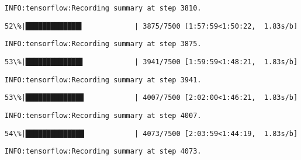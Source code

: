 \documentclass[11pt]{article}
\begin{document}
    \begin{Verbatim}[commandchars=\\\{\}]
INFO:tensorflow:Recording summary at step 3810.

    \end{Verbatim}

    \begin{Verbatim}[commandchars=\\\{\}]
 52\%|█████████████▍            | 3875/7500 [1:57:59<1:50:22,  1.83s/b]
    \end{Verbatim}

    \begin{Verbatim}[commandchars=\\\{\}]
INFO:tensorflow:Recording summary at step 3875.

    \end{Verbatim}

    \begin{Verbatim}[commandchars=\\\{\}]
 53\%|█████████████▋            | 3941/7500 [1:59:59<1:48:21,  1.83s/b]
    \end{Verbatim}

    \begin{Verbatim}[commandchars=\\\{\}]
INFO:tensorflow:Recording summary at step 3941.

    \end{Verbatim}

    \begin{Verbatim}[commandchars=\\\{\}]
 53\%|█████████████▉            | 4007/7500 [2:02:00<1:46:21,  1.83s/b]
    \end{Verbatim}

    \begin{Verbatim}[commandchars=\\\{\}]
INFO:tensorflow:Recording summary at step 4007.

    \end{Verbatim}

    \begin{Verbatim}[commandchars=\\\{\}]
 54\%|██████████████            | 4073/7500 [2:03:59<1:44:19,  1.83s/b]
    \end{Verbatim}

    \begin{Verbatim}[commandchars=\\\{\}]
INFO:tensorflow:Recording summary at step 4073.

    \end{Verbatim}
\end{document}
